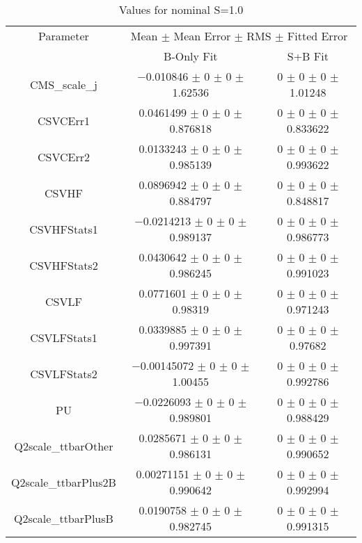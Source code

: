 \begin{table}
\centering
\caption{Values for nominal S=1.0}
\begin{tabular}{ccc}
\toprule
Parameter & \multicolumn{2}{c}{Mean $\pm$ Mean Error $\pm$ RMS $\pm$ Fitted Error}\\
 & B-Only Fit & S+B Fit\\
\midrule
CMS\_scale\_j & \num{-0.010846} $\pm$ \num{0} $\pm$ \num{0} $\pm$ \num{1.62536} & \num{0} $\pm$ \num{0} $\pm$ \num{0} $\pm$ \num{1.01248}\\
CSVCErr1 & \num{0.0461499} $\pm$ \num{0} $\pm$ \num{0} $\pm$ \num{0.876818} & \num{0} $\pm$ \num{0} $\pm$ \num{0} $\pm$ \num{0.833622}\\
CSVCErr2 & \num{0.0133243} $\pm$ \num{0} $\pm$ \num{0} $\pm$ \num{0.985139} & \num{0} $\pm$ \num{0} $\pm$ \num{0} $\pm$ \num{0.993622}\\
CSVHF & \num{0.0896942} $\pm$ \num{0} $\pm$ \num{0} $\pm$ \num{0.884797} & \num{0} $\pm$ \num{0} $\pm$ \num{0} $\pm$ \num{0.848817}\\
CSVHFStats1 & \num{-0.0214213} $\pm$ \num{0} $\pm$ \num{0} $\pm$ \num{0.989137} & \num{0} $\pm$ \num{0} $\pm$ \num{0} $\pm$ \num{0.986773}\\
CSVHFStats2 & \num{0.0430642} $\pm$ \num{0} $\pm$ \num{0} $\pm$ \num{0.986245} & \num{0} $\pm$ \num{0} $\pm$ \num{0} $\pm$ \num{0.991023}\\
CSVLF & \num{0.0771601} $\pm$ \num{0} $\pm$ \num{0} $\pm$ \num{0.98319} & \num{0} $\pm$ \num{0} $\pm$ \num{0} $\pm$ \num{0.971243}\\
CSVLFStats1 & \num{0.0339885} $\pm$ \num{0} $\pm$ \num{0} $\pm$ \num{0.997391} & \num{0} $\pm$ \num{0} $\pm$ \num{0} $\pm$ \num{0.97682}\\
CSVLFStats2 & \num{-0.00145072} $\pm$ \num{0} $\pm$ \num{0} $\pm$ \num{1.00455} & \num{0} $\pm$ \num{0} $\pm$ \num{0} $\pm$ \num{0.992786}\\
PU & \num{-0.0226093} $\pm$ \num{0} $\pm$ \num{0} $\pm$ \num{0.989801} & \num{0} $\pm$ \num{0} $\pm$ \num{0} $\pm$ \num{0.988429}\\
Q2scale\_ttbarOther & \num{0.0285671} $\pm$ \num{0} $\pm$ \num{0} $\pm$ \num{0.986131} & \num{0} $\pm$ \num{0} $\pm$ \num{0} $\pm$ \num{0.990652}\\
Q2scale\_ttbarPlus2B & \num{0.00271151} $\pm$ \num{0} $\pm$ \num{0} $\pm$ \num{0.990642} & \num{0} $\pm$ \num{0} $\pm$ \num{0} $\pm$ \num{0.992994}\\
Q2scale\_ttbarPlusB & \num{0.0190758} $\pm$ \num{0} $\pm$ \num{0} $\pm$ \num{0.982745} & \num{0} $\pm$ \num{0} $\pm$ \num{0} $\pm$ \num{0.991315}\\

\end{tabular}
\end{table}
